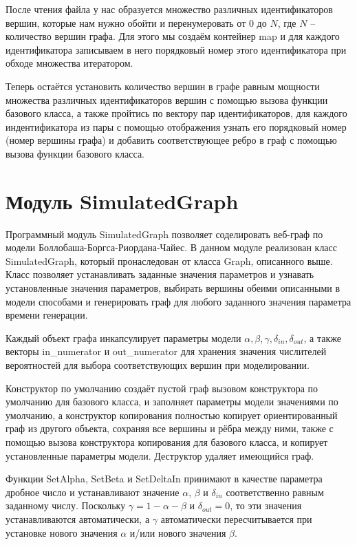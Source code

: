 \documentclass[14pt]{extreport}
\begin{document}
После чтения файла у нас образуется множество различных идентификаторов вершин, которые нам нужно обойти и перенумеровать от $0$ до $N$, где $N$ -- количество вершин графа. Для этого мы создаём контейнер map и для каждого идентификатора записываем в него порядковый номер этого идентификатора при обходе множества итератором.

Теперь остаётся установить количество вершин в графе равным мощности множества различных идентификаторов вершин с помощью вызова функции базового класса, а также пройтись по вектору пар идентификаторов, для каждого индентификатора из пары с помощью отображения узнать его порядковый номер (номер вершины графа) и добавить соответствующее ребро в граф с помощью вызова функции базового класса.

\section{Модуль SimulatedGraph}

Программный модуль SimulatedGraph позволяет соделировать веб-граф по модели Боллобаша-Боргса-Риордана-Чайес. В данном модуле реализован класс SimulatedGraph, который пронаследован от класса Graph, описанного выше. Класс позволяет устанавливать заданные значения параметров и узнавать установленные значения параметров, выбирать вершины обеими описанными в модели способами и генерировать граф для любого заданного значения параметра времени генерации.

Каждый объект графа инкапсулирует параметры модели $\alpha, \beta, \gamma, \delta_{in}, \delta_{out}$, а также векторы in\_numerator и out\_numerator для хранения значения числителей вероятностей для выбора соответствующих вершин при моделировании.

Конструктор по умолчанию создаёт пустой граф вызовом конструктора по умолчанию для базового класса, и заполняет параметры модели значениями по умолчанию, а конструктор копирования полностью копирует ориентированный граф из другого объекта, сохраняя все вершины и рёбра между ними, также с помощью вызова конструктора копирования для базового класса, и копирует установленные параметры модели. Деструктор удаляет имеющийся граф.

Функции SetAlpha, SetBeta и SetDeltaIn принимают в качестве параметра дробное число и устанавливают значение $\alpha$, $\beta$ и $\delta_{in}$ соответственно равным заданному числу. Поскольку $\gamma = 1 - \alpha - \beta$ и $\delta_{out} = 0$, то эти значения устанавливаются автоматически, а $\gamma$ автоматически пересчитывается при установке нового значения $\alpha$ и/или нового значения $\beta$.
\end{document}
